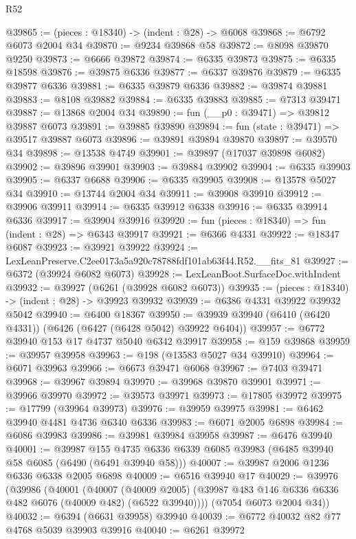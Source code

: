 \begin{lexlean}{R52}
\begin{coremodule}
@39865 := (pieces : @18340) -> (indent : @28) -> @6068
@39868 := @6792 @6073 @2004 @34
@39870 := @9234 @39868 @58
@39872 := @8098 @39870 @9250
@39873 := @6666 @39872
@39874 := @6335 @39873
@39875 := @6335 @18598
@39876 := @39875 @6336
@39877 := @6337 @39876
@39879 := @6335 @39877 @6336
@39881 := @6335 @39879 @6336
@39882 := @39874 @39881
@39883 := @8108 @39882
@39884 := @6335 @39883
@39885 := @7313 @39471
@39887 := @13868 @2004 @34
@39890 := fun (__p0 : @39471) => @39812 @39887 @6073
@39891 := @39885 @39890
@39894 := fun (state : @39471) => @39517 @39887 @6073
@39896 := @39891 @39894 @39870
@39897 := @39570 @34
@39898 := @13538 @4749
@39901 := @39897 (@17037 @39898 @6082)
@39902 := @39896 @39901
@39903 := @39884 @39902
@39904 := @6335 @39903
@39905 := @6337 @6688
@39906 := @6335 @39905
@39908 := @13578 @5027 @34
@39910 := @13744 @2004 @34
@39911 := @39908 @39910
@39912 := @39906 @39911
@39914 := @6335 @39912 @6338
@39916 := @6335 @39914 @6336
@39917 := @39904 @39916
@39920 := fun (pieces : @18340) => fun (indent : @28) => @6343 @39917
@39921 := @6366 @4331
@39922 := @18347 @6087
@39923 := @39921 @39922
@39924 := LexLeanPreserve.C2ee0173a5a920c78788fdf101ab63f44.R52.__fits_81
@39927 := @6372 (@39924 @6082 @6073)
@39928 := LexLeanBoot.SurfaceDoc.withIndent
@39932 := @39927 (@6261 (@39928 @6082 @6073))
@39935 := (pieces : @18340) -> (indent : @28) -> @39923 @39932
@39939 := @6386 @4331 @39922 @39932 @5042
@39940 := @6400 @18367
@39950 := @39939 @39940 (@6410 (@6420 @4331)) (@6426 (@6427 (@6428 @5042) @39922 @6404))
@39957 := @6772 @39940 @153 @17 @4737 @5040 @6342 @39917
@39958 := @159 @39868
@39959 := @39957 @39958
@39963 := @198 (@13583 @5027 @34 @39910)
@39964 := @6071 @39963
@39966 := @6673 @39471 @6068
@39967 := @7403 @39471
@39968 := @39967 @39894
@39970 := @39968 @39870 @39901
@39971 := @39966 @39970
@39972 := @39573 @39971
@39973 := @17805 @39972
@39975 := @17799 (@39964 @39973)
@39976 := @39959 @39975
@39981 := @6462 @39940 @4481 @4736 @6340 @6336
@39983 := @6071 @2005 @6898
@39984 := @6086 @39983
@39986 := @39981 @39984 @39958
@39987 := @6476 @39940
@40001 := @39987
    @155
    @4735
    @6336
    @6339
    @6085
    @39983
    (@6485 @39940 @58 @6085 (@6490 (@6491 @39940 @58)))
@40007 := @39987 @2006 @1236 @6336 @6338 @2005 @6898
@40009 := @6516 @39940 @17
@40029 := @39976
    (@39986
      (@40001
        (@40007
          (@40009 @2005)
          (@39987 @483 @146 @6336 @6336 @482 @6076 (@40009 @482) (@6522 @39940))))
      (@7054 @6073 @2004 @34))
@40032 := @6394 (@6631 @39958) @39940
@40039 := @6772 @40032 @82 @77 @4768 @5039 @39903 @39916
@40040 := @6261 @39972

\end{coremodule}
\end{lexlean}
